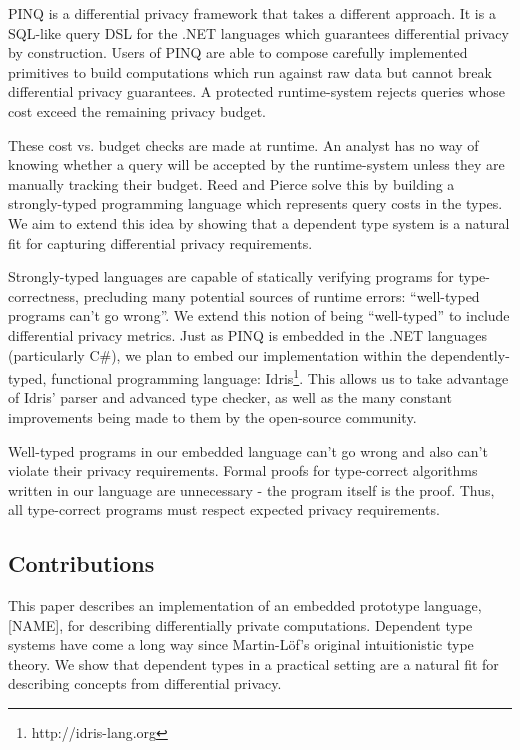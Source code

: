 \documentclass[12pt]{article}
\begin{document}
PINQ\cite{conf/sigmod/McSherry09} is a differential privacy framework that takes a different approach.
It is a SQL-like query DSL for the .NET languages which guarantees differential privacy by construction.
Users of PINQ are able to compose carefully implemented primitives to build computations which run against raw data but cannot break differential privacy guarantees.
A protected runtime-system rejects queries whose cost exceed the remaining privacy budget.

These cost vs. budget checks are made at runtime.
An analyst has no way of knowing whether a query will be accepted by the runtime-system unless they are manually tracking their budget.
Reed and Pierce\cite{conf/icfp/ReedP10} solve this by building a strongly-typed programming language which represents query costs in the types.
We aim to extend this idea by showing that a dependent type system is a natural fit for capturing differential privacy requirements.

Strongly-typed languages are capable of statically verifying programs for type-correctness, precluding many potential sources of runtime errors: ``well-typed programs can't go wrong''.
We extend this notion of being ``well-typed'' to include differential privacy metrics.
Just as PINQ is embedded in the .NET languages (particularly C\#), we plan to embed our implementation within the dependently-typed, functional programming language: Idris\footnote{http://idris-lang.org}.
This allows us to take advantage of Idris' parser and advanced type checker, as well as the many constant improvements being made to them by the open-source community.

Well-typed programs in our embedded language can't go wrong and also can't violate their privacy requirements.
Formal proofs for type-correct algorithms written in our language are unnecessary - the program itself is the proof.
Thus, all type-correct programs must respect expected privacy requirements.

\subsection{Contributions}

This paper describes an implementation of an embedded prototype language, [NAME], for describing differentially private computations.
Dependent type systems have come a long way since Martin-L\"of's original intuitionistic type theory.
We show that dependent types in a practical setting are a natural fit for describing concepts from differential privacy.
\end{document}
